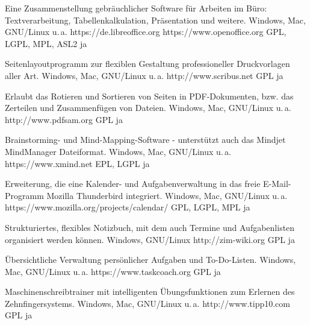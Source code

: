 





{Eine Zusammenstellung gebräuchlicher Software für Arbeiten im Büro: Textverarbeitung, Tabellenkalkulation, Präsentation und weitere.}
{Windows, Mac, GNU/Linux u.\,a.}
{https://de.libreoffice.org https://www.openoffice.org}
{GPL, LGPL, MPL, ASL2}
{ja}

{Seitenlayoutprogramm zur flexiblen Gestaltung professioneller Druckvorlagen aller Art.}
{Windows, Mac, GNU/Linux u.\,a.}
{http://www.scribus.net}
{GPL}
{ja}

{Erlaubt das Rotieren und Sortieren von Seiten in PDF-Dokumenten, bzw. das Zerteilen und Zusammenfügen von Dateien.}
{Windows, Mac, GNU/Linux u.\,a.}
{http://www.pdfsam.org}
{GPL}
{ja}

{Brainstorming- und Mind-Mapping-Software - unterstützt auch das Mindjet MindManager Dateiformat.}
{Windows, Mac, GNU/Linux u.\,a.}
{https://www.xmind.net}
{EPL, LGPL}
{ja}

{Erweiterung, die eine Kalender- und Aufgabenverwaltung in das freie E-Mail-Programm Mozilla Thunderbird integriert.}
{Windows, Mac, GNU/Linux u.\,a.}
{https://www.mozilla.org/projects/calendar/}
{GPL, LGPL, MPL}
{ja}

{Strukturiertes, flexibles Notizbuch, mit dem auch Termine und Aufgabenlisten organisiert werden können.}
{Windows, GNU/Linux}
{http://zim-wiki.org}
{GPL}
{ja}

{Übersichtliche Verwaltung persönlicher Aufgaben und To-Do-Listen.}
{Windows, Mac, GNU/Linux u.\,a.}
{https://www.taskcoach.org}
{GPL}
{ja}


{Maschinenschreibtrainer mit intelligenten Übungsfunktionen zum Erlernen des Zehnfingersystems.}
{Windows, Mac, GNU/Linux u.\,a.}
{http://www.tipp10.com}
{GPL}
{ja}

\backpage


